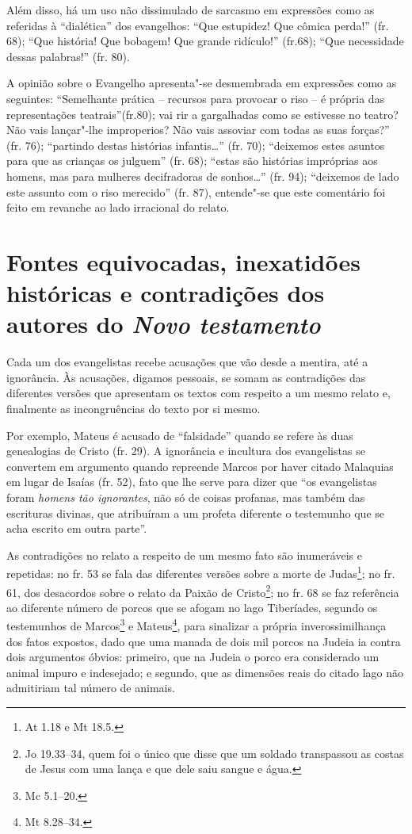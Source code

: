 Além disso, há um uso não dissimulado de sarcasmo em expressões como as
referidas à “dialética” dos evangelhos:
``Que estupidez! Que cômica perda!” (fr. 68);
``Que história! Que bobagem! Que grande ridículo!” (fr.68);
``Que necessidade dessas palabras!” (fr. 80).

A opinião sobre o Evangelho apresenta"-se desmembrada em expressões como as
seguintes: “Semelhante prática – recursos para provocar o riso -- é própria das
representações teatrais”(fr.80); vai rir a gargalhadas como se estivesse no
teatro? Não vais lançar"-lhe improperios? Não vais assoviar com todas as suas
forças?” (fr. 76); ``partindo destas histórias infantis…” (fr. 70); ``deixemos estes asuntos
para que as crianças os julguem” (fr. 68); ``estas são histórias impróprias aos
homens, mas para mulheres decifradoras de sonhos…” (fr. 94); ``deixemos de lado
este assunto com o riso merecido” (fr. 87), entende"-se que este comentário foi
feito em revanche ao lado irracional do relato.

\section{Fontes equivocadas, inexatidões históricas e contradições dos autores
do \textit{Novo testamento}}

Cada um dos evangelistas recebe acusações que vão desde a mentira, até a
ignorância. Às acusações, digamos pessoais, se somam as contradições
das diferentes versões que apresentam os textos com respeito a um mesmo
relato e, finalmente as incongruências do texto por si mesmo.

Por exemplo, Mateus é acusado de “falsidade” quando se refere às duas
genealogias de Cristo (fr. 29). A ignorância e incultura dos
evangelistas se convertem em argumento quando repreende Marcos por
haver citado Malaquias em lugar de Isaías (fr. 52), fato que lhe serve
para dizer que “os evangelistas foram \textit{homens tão ignorantes},
não só de coisas profanas, mas também das escrituras divinas, que
atribuíram a um profeta diferente o testemunho que se acha escrito em
outra parte”.

As contradições no relato a respeito de um mesmo fato são inumeráveis e
repetidas: no fr. 53 se fala das diferentes versões sobre a morte de
Judas\footnote{ At 1.18 e Mt 18.5.}; no
fr. 61, dos desacordos sobre o relato da Paixão de Cristo\footnote{
Jo 19.33--34, quem foi o único que disse que um soldado
transpassou as costas de Jesus com uma lança e que dele saiu sangue e
água.}; no fr. 68 se faz referência ao diferente número de porcos que
se afogam no lago Tiberíades, segundo os testemunhos de
Marcos\footnote{ Mc 5.1--20.} e Mateus\footnote{
Mt 8.28--34.}, para sinalizar a própria inverossimilhança
dos fatos expostos, dado que uma manada de dois mil porcos na Judeia ia
contra dois argumentos óbvios: primeiro, que na Judeia o porco era
considerado um animal impuro e indesejado; e segundo, que as dimensões
reais do citado lago não admitiriam tal número de animais.


